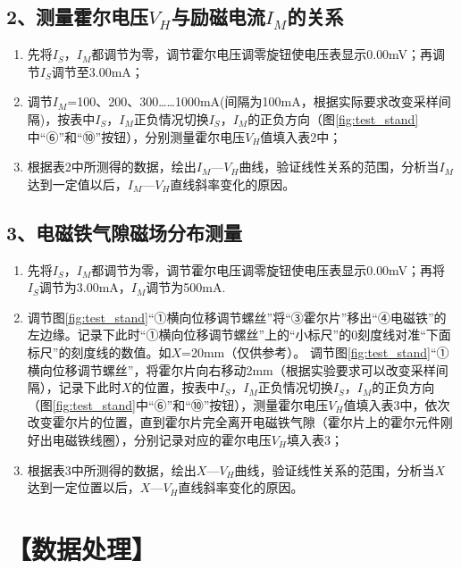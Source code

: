 \documentclass[UTF8]{article}
\begin{document}
	
	\subsection*{2、测量霍尔电压$V_H$与励磁电流$I_M$的关系}
	\begin{enumerate}
		\item 先将$I_S$，$I_M$都调节为零，调节霍尔电压调零旋钮使电压表显示0.00mV；再调节$I_S$调节至3.00mA；
		\item 调节$I_M$=100、200、300……1000mA(间隔为100mA，根据实际要求改变采样间隔)，按表中$I_S$，$I_M$正负情况切换$I_S$，$I_M$的正负方向（图\ref{fig:test_stand}中“⑥”和“⑩”按钮），分别测量霍尔电压$V_H$值填入表2中；
		\item 根据表2中所测得的数据，绘出$I_M$—$V_H$曲线，验证线性关系的范围，分析当$I_M$达到一定值以后，$I_M$—$V_H$直线斜率变化的原因。
	\end{enumerate}
	
	
	\subsection*{3、电磁铁气隙磁场分布测量}
	\begin{enumerate}
		\item 先将$I_S$，$I_M$都调节为零，调节霍尔电压调零旋钮使电压表显示0.00mV；再将$I_S$调节为3.00mA，$I_M$调节为500mA.
		\item 调节图\ref{fig:test_stand}“①横向位移调节螺丝”将“③霍尔片”移出“④电磁铁”的左边缘。记录下此时“①横向位移调节螺丝”上的“小标尺”的0刻度线对准“下面标尺”的刻度线的数值。如$X$=20mm（仅供参考）。
		调节图\ref{fig:test_stand}“①横向位移调节螺丝”，将霍尔片向右移动2mm（根据实验要求可以改变采样间隔），记录下此时$X$的位置，按表中$I_S$，$I_M$正负情况切换$I_S$，$I_M$的正负方向（图\ref{fig:test_stand}中“⑥”和“⑩”按钮），测量霍尔电压$V_H$值填入表3中，依次改变霍尔片的位置，直到霍尔片完全离开电磁铁气隙（霍尔片上的霍尔元件刚好出电磁铁线圈），分别记录对应的霍尔电压$V_H$填入表3；
		\item 根据表3中所测得的数据，绘出$X$—$V_H$曲线，验证线性关系的范围，分析当$X$达到一定位置以后，$X$—$V_H$直线斜率变化的原因。
	\end{enumerate}
	
    \section*{【数据处理】}
\end{document}
